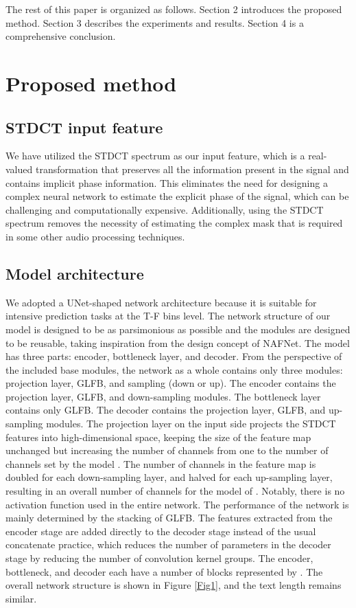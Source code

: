 \documentclass{INTERSPEECH2023}
\begin{document}
The rest of this paper is organized as follows. Section 2 introduces the proposed method. Section 3 describes the experiments and results. Section 4 is a comprehensive conclusion.

\section{Proposed method}

\subsection{STDCT input feature}
We have utilized the STDCT spectrum as our input feature, which is a real-valued transformation that preserves all the information present in the signal and contains implicit phase information\cite{gao2021low,DCTCRN}. This eliminates the need for designing a complex neural network to estimate the explicit phase of the signal, which can be challenging and computationally expensive. Additionally, using the STDCT spectrum removes the necessity of estimating the complex mask that is required in some other audio processing techniques. 

\subsection{Model architecture}
We adopted a UNet-shaped network architecture because it is suitable for intensive prediction tasks at the T-F bins level. The network structure of our model is designed to be as parsimonious as possible and the modules are designed to be reusable, taking inspiration from the design concept of NAFNet. The model has three parts: encoder, bottleneck layer, and decoder. From the perspective of the included base modules, the network as a whole contains only three modules: projection layer, GLFB, and sampling (down or up). The encoder contains the projection layer, GLFB, and down-sampling modules. The bottleneck layer contains only GLFB. The decoder contains the projection layer, GLFB, and up-sampling modules. The projection layer on the input side projects the STDCT features into high-dimensional space, keeping the size of the feature map unchanged but increasing the number of channels from one to the number of channels set by the model . The number of channels in the feature map is doubled for each down-sampling layer, and halved for each up-sampling layer, resulting in an overall number of channels for the model of . Notably, there is no activation function used in the entire network. The performance of the network is mainly determined by the stacking of GLFB. The features extracted from the encoder stage are added directly to the decoder stage instead of the usual concatenate practice, which reduces the number of parameters in the decoder stage by reducing the number of convolution kernel groups. The encoder, bottleneck, and decoder each have a number of blocks represented by . The overall network structure is shown in Figure \ref{Fig1}, and the text length remains similar.
\end{document}
